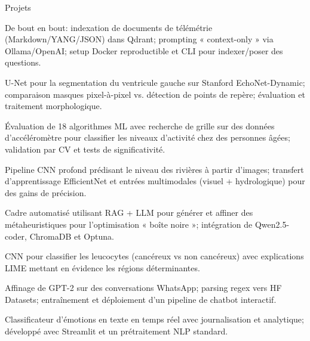 \begin{rubricnorepeat}{Projets}


De bout en bout: indexation de documents de télémétrie (Markdown/YANG/JSON) dans Qdrant; prompting « context-only » via Ollama/OpenAI; setup Docker reproductible et CLI pour indexer/poser des questions.\hfill 
\href{https://github.com/musel25/telemetry-rag}{\faGithub}

U-Net pour la segmentation du ventricule gauche sur Stanford EchoNet-Dynamic; comparaison masques pixel-à-pixel vs. détection de points de repère; évaluation et traitement morphologique.\hfill\href{https://github.com/Tec-AI-23/EchoNetDynamic}{\faGithub}

Évaluation de 18 algorithmes ML avec recherche de grille sur des données d’accéléromètre pour classifier les niveaux d’activité chez des personnes âgées; validation par CV et tests de significativité.\hfill \href{https://github.com/Tec-AI-23/HAR70}{\faGithub}

Pipeline CNN profond prédisant le niveau des rivières à partir d’images; transfert d’apprentissage EfficientNet et entrées multimodales (visuel + hydrologique) pour des gains de précision.\hfill \href{https://github.com/musel25/research_deep_learning}{\faGithub}

Cadre automatisé utilisant RAG + LLM pour générer et affiner des métaheuristiques pour l’optimisation « boîte noire »; intégration de Qwen2.5-coder, ChromaDB et Optuna.\hfill \href{https://github.com/musel25/llm-metaheuristics}{\faGithub}

CNN pour classifier les leucocytes (cancéreux vs non cancéreux) avec explications LIME mettant en évidence les régions déterminantes. 

Affinage de GPT-2 sur des conversations WhatsApp; parsing regex vers HF Datasets; entraînement et déploiement d’un pipeline de chatbot interactif.\hfill \href{https://github.com/musel25/her_if_it_was_2025}{\faGithub}

Classificateur d’émotions en texte en temps réel avec journalisation et analytique; développé avec Streamlit et un prétraitement NLP standard.\hfill \href{https://github.com/musel25/nlp_project}{\faGithub}

\end{rubricnorepeat}


